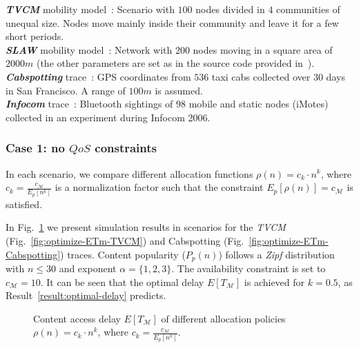 \documentclass[journal]{IEEEtran}
\begin{document}
\noindent\textit{\textbf{TVCM}} mobility model~\cite{tvcm}: Scenario with $100$ nodes divided in $4$ communities of unequal size. Nodes move mainly inside their community and leave it for a few short periods.\\
\textit{\textbf{SLAW}} mobility model~\cite{slaw}: Network with $200$ nodes moving in a square area of $2000m$ (the other parameters are set as in the source code provided in~\cite{slaw}).\\
\textit{\textbf{Cabspotting}} trace~\cite{cabspotting-trace}: GPS coordinates from $536$ taxi cabs collected over 30 days in San Francisco. A range of $100m$ is assumed.\\
\textit{\textbf{Infocom}} trace~\cite{Infocom-trace}: Bluetooth sightings of $98$ mobile and static nodes (iMotes) collected in an experiment during Infocom 2006.

\subsubsection{Case 1: no $QoS$ constraints}
In each scenario, we compare different allocation functions $\rho(n) = c_{k}\cdot n^{k}$, where $c_{k} = \frac{c_{\mathcal{M}}}{E_{p}[n^{k}]}$ is a normalization factor such that the constraint $E_{p}[\rho(n)]=c_{\mathcal{M}}$ is satisfied.

In Fig.~\ref{fig:optimize-ETm} we present simulation results in scenarios for the \textit{TVCM} (Fig.~\ref{fig:optimize-ETm-TVCM}) and Cabspotting (Fig.~\ref{fig:optimize-ETm-Cabspotting}) traces. Content popularity ($P_{p}(n)$) follows a \textit{Zipf} distribution with $n\leq 30$ and exponent $\alpha=\{1,2,3\}$. The availability constraint is set to $c_{\mathcal{M}}=10$. It can be seen that the optimal delay $E[T_{\mathcal{M}}]$ is achieved for $k = 0.5$, as Result~\ref{result:optimal-delay} predicts.\begin{figure}
\centering
{}
\caption{Content access delay $E[T_{\mathcal{M}}]$ of different allocation policies $\rho(n) = c_{k}\cdot n^{k}$, where $c_{k} = \frac{c_{\mathcal{M}}}{E_{p}[n^{k}]}$.}
\label{fig:optimize-ETm}
\end{figure}	
\end{document}
